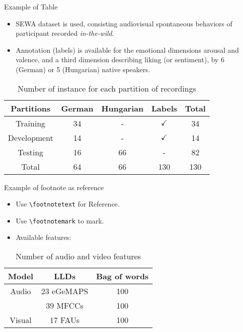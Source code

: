 \documentclass{beamer}
\begin{document}
\begin{frame}[t, fragile]{Example of Table}
\begin{itemize}
\item SEWA dataset is used, consisting audiovisual spontaneous behaviors of 
      participant recorded \emph{in-the-wild}.
\item Annotation (labels) is available for the emotional dimensions arousal and valence, and a third dimension describing liking (or sentiment), by 6 (German) or 5 (Hungarian) native speakers.
\end{itemize}
\begin{table}[ht]
  \caption{Number of instance for each partition of recordings}
  \label{tab:instance}
  \begin{tabular}{c c c c c}
    \hline
    Partitions & German & Hungarian & Labels & Total \\
    \hline
    Training	&	34	&	-	& $\checkmark$	&	34	\\
	Development	&	14	&	-	& $\checkmark$	&	14	\\
	Testing		&	16	&	66	&	-			&	82	\\
	Total		&	64	&	66	&	130			&	130	\\
	\hline
	\end{tabular}

\end{table}

\end{frame}

\begin{frame}[t, fragile]{Example of footnote as reference}
\begin{itemize}
\item Use \verb|\footnotetext| for Reference.
\item Use \verb|\footnotemark| to mark.
\item Available features:
\end{itemize}
\begin{table}
  \caption{ Number of audio and video features}
  \label{tab:numfeatures}
  \begin{tabular}{c c c}
    \hline
    Model & LLDs & Bag of words \\
    \hline
    Audio	&	23 eGeMAPS	& 100	\\
			&	39 MFCCs	& 100	\\
	Visual	&	17 FAUs	&	100	\\
	\hline
	\end{tabular}
\end{table}
\end{frame}
\end{document}
